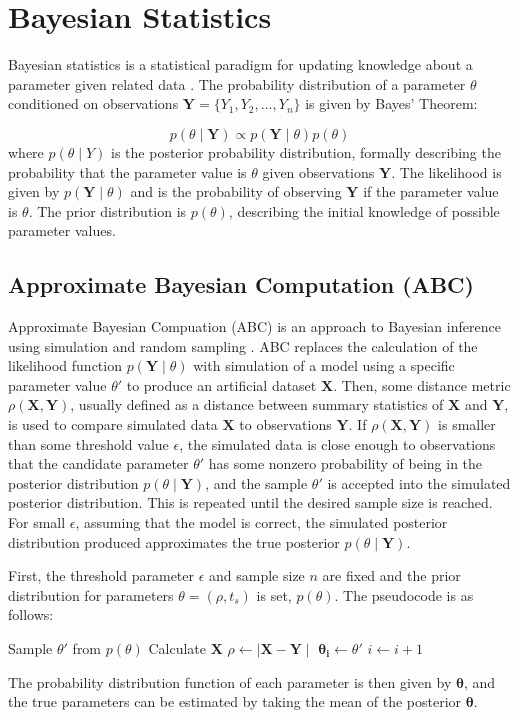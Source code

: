 
\section{Bayesian Statistics}

Bayesian statistics is a statistical paradigm for updating knowledge about a
parameter given related data \cite{Gelman2013}. The probability distribution of a parameter
$\theta$ conditioned on observations $\bm{Y} = \{ Y_1, Y_2, ..., Y_n \}$ is
given by Bayes' Theorem:

\begin{equation}
  p(\theta \mid \bm{Y}) \propto p(\bm{Y} \mid \theta) p(\theta)
  \nonumber
\end{equation}
%
where $p(\theta \mid Y)$ is the posterior probability distribution, formally
describing the probability that the parameter value is $\theta$ given
observations $\bm{Y}$. The likelihood is given by $p(\bm{Y} \mid \theta)$ and
is the probability of observing $\bm{Y}$ if the parameter value is $\theta$. The
prior distribution is $p(\theta)$, describing the initial knowledge of possible
parameter values.

\subsection{Approximate Bayesian Computation (ABC)}

Approximate Bayesian Compuation (ABC) is an approach to Bayesian inference using
simulation and random sampling \cite{Beaumont2002, Sisson2010}.
ABC replaces the calculation
of the likelihood function $p(\bm{Y} \mid \theta)$ with simulation of a model using a specific parameter value $\theta'$ to produce an artificial dataset
$\bm{X}$. Then, some distance metric $\rho (\bm{X}, \bm{Y}) $, usually defined
as a distance between summary statistics of $\bm{X}$ and $\bm{Y}$, is used to
compare simulated data $\bm{X}$ to observations $\bm{Y}$. If $\rho (\bm{X},
\bm{Y}) $ is smaller than some threshold value $\epsilon$, the simulated data is
close enough to observations that the candidate parameter $\theta'$ has some
nonzero probability of being in the posterior distribution $ p(\theta \mid
\bm{Y})$, and the sample $\theta'$ is accepted into the simulated posterior
distribution. This is repeated until the desired sample size is reached. For small $\epsilon$, assuming that the model is correct, the simulated posterior distribution produced approximates the
true posterior $ p(\theta \mid \bm{Y})$.

First, the threshold parameter $\epsilon$ and sample size $n$ are fixed and the
prior distribution for parameters $\theta = (\rho, t_s)$ is set, $p(\theta)$. The pseudocode is as follows:
%
\begin{algorithmic}
    \State  Sample $\theta'$ from $p(\theta)$
    \State Calculate $\bm{X}$
    \State $\rho \gets \mid \bm{X} - \bm{Y} \mid$
    \If {$\bar{\rho} < \epsilon$}
      \State $\bm{\theta_i} \gets \theta'$
    	\State $i \gets i + 1$
    \EndIf
  \EndWhile
\end{algorithmic}
%
The probability distribution function of each parameter is then given by $\bm{\theta}$, and the true parameters can be estimated by taking the mean of the posterior $\bm{\theta}$.
